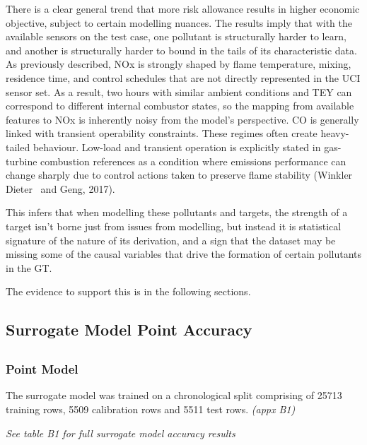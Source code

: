 \documentclass[11pt]{article}
\begin{document}
There is a clear general trend that more risk allowance results in
higher economic objective, subject to certain modelling nuances. The
results imply that with the available sensors on the test case, one
pollutant is structurally harder to learn, and another is structurally
harder to bound in the tails of its characteristic data. As previously
described, NOx is strongly shaped by flame temperature, mixing,
residence time, and control schedules that are not directly represented
in the UCI sensor set. As a result, two hours with similar ambient
conditions and TEY can correspond to different internal combustor
states, so the mapping from available features to NOx is inherently
noisy from the model's perspective. CO is generally linked with
transient operability constraints. These regimes often create
heavy-tailed behaviour. Low-load and transient operation is explicitly
stated in gas-turbine combustion references as a condition where
emissions performance can change sharply due to control actions taken to
preserve flame stability (Winkler Dieter~ and Geng, 2017).

This infers that when modelling these pollutants and targets, the
strength of a target isn't borne just from issues from modelling, but
instead it is statistical signature of the nature of its derivation, and
a sign that the dataset may be missing some of the causal variables that
drive the formation of certain pollutants in the GT.

The evidence to support this is in the following sections.

\subsection{Surrogate Model Point
Accuracy}\label{surrogate-model-point-accuracy}

\subsection{}\label{section-12}

\subsubsection{Point Model}\label{point-model}

The surrogate model was trained on a chronological split comprising of
25713 training rows, 5509 calibration rows and 5511 test rows.
\emph{(appx B1)}

\emph{See table B1 for full surrogate model accuracy results}
\end{document}
